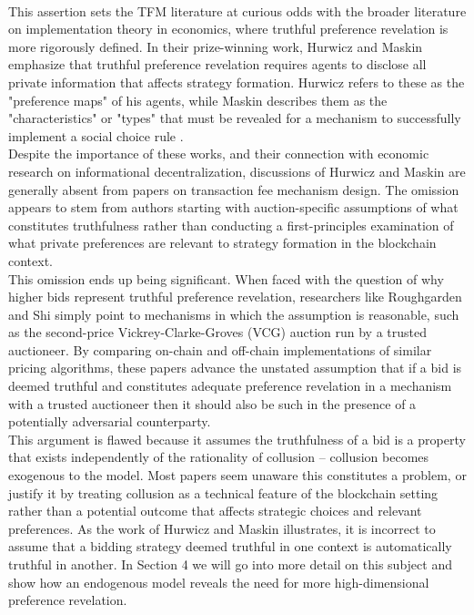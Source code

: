 \documentclass[11pt,a4paper]{llncs}
\begin{document}
\vspace{0.2cm} \\
This assertion sets the TFM literature at curious odds with the broader literature on implementation theory in economics, where truthful preference revelation is more rigorously defined. In their prize-winning work, Hurwicz and Maskin emphasize that truthful preference revelation requires agents to disclose all private information that affects strategy formation. Hurwicz refers to these as the "preference maps" of his agents, while Maskin describes them as the "characteristics" or "types" that must be revealed for a mechanism to successfully implement a social choice rule \cite{hurwicz1973design, hurwicz1960optimality, hurwicz2007guardians, hurwicz1979allocations, maskin1999nash, maskin2002}.
\vspace{0.2cm} \\
Despite the importance of these works, and their connection with economic research on informational decentralization, discussions of Hurwicz and Maskin are generally absent from papers on transaction fee mechanism design. The omission appears to stem from authors starting with auction-specific assumptions of what constitutes truthfulness rather than conducting a first-principles examination of what private preferences are relevant to strategy formation in the blockchain context.
\vspace{0.2cm} \\
This omission ends up being significant. When faced with the question of why higher bids represent truthful preference revelation, researchers like Roughgarden and Shi simply point to mechanisms in which the assumption is reasonable, such as the second-price Vickrey-Clarke-Groves (VCG) auction run by a trusted auctioneer. By comparing on-chain and off-chain implementations of similar pricing algorithms, these papers advance the unstated assumption that if a bid is deemed truthful and constitutes adequate preference revelation in a mechanism with a trusted auctioneer then it should also be such in the presence of a potentially adversarial counterparty.
\vspace{0.2cm} \\
This argument is flawed because it assumes the truthfulness of a bid is a property that exists independently of the rationality of collusion -- collusion becomes exogenous to the model. Most papers seem unaware this constitutes a problem, or justify it by treating collusion as a technical feature of the blockchain setting rather than a potential outcome that affects strategic choices and relevant preferences. As the work of Hurwicz and Maskin illustrates, it is incorrect to assume that a bidding strategy deemed truthful in one context is automatically truthful in another. In Section 4 we will go into more detail on this subject and show how an endogenous model reveals the need for more high-dimensional preference revelation.
\end{document}
